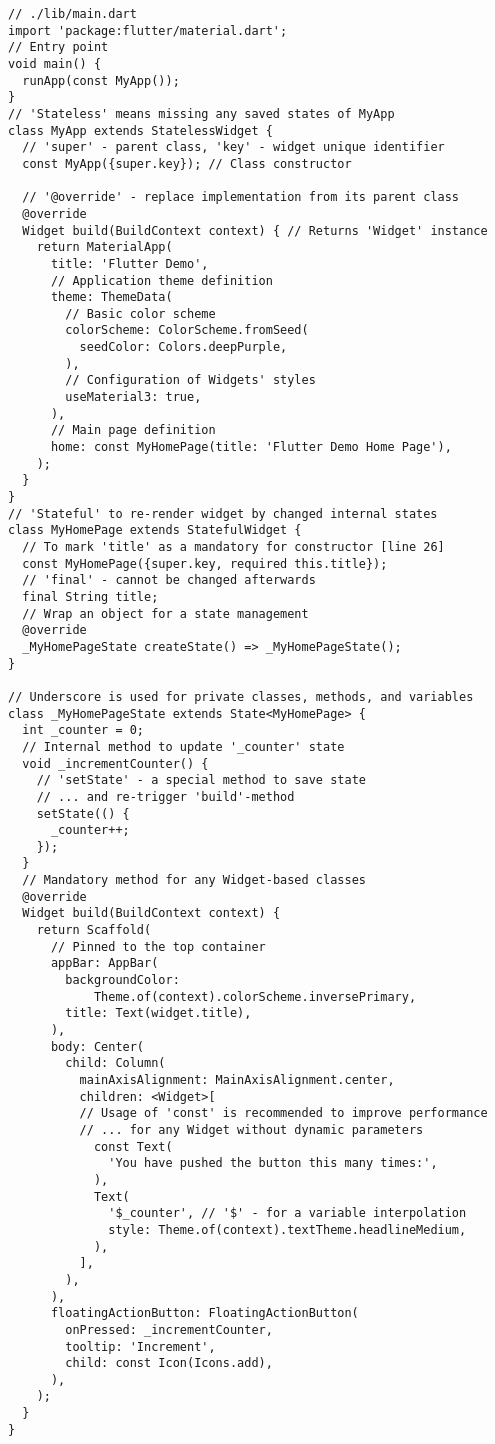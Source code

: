 \begin{lstlisting}
// ./lib/main.dart
import 'package:flutter/material.dart';
// Entry point
void main() {
  runApp(const MyApp());
}
// 'Stateless' means missing any saved states of MyApp
class MyApp extends StatelessWidget {
  // 'super' - parent class, 'key' - widget unique identifier
  const MyApp({super.key}); // Class constructor
  
  // '@override' - replace implementation from its parent class
  @override
  Widget build(BuildContext context) { // Returns 'Widget' instance
    return MaterialApp(
      title: 'Flutter Demo',
      // Application theme definition
      theme: ThemeData(
        // Basic color scheme
        colorScheme: ColorScheme.fromSeed(
          seedColor: Colors.deepPurple,
        ),
        // Configuration of Widgets' styles
        useMaterial3: true,
      ),
      // Main page definition
      home: const MyHomePage(title: 'Flutter Demo Home Page'),
    );
  }
}
// 'Stateful' to re-render widget by changed internal states
class MyHomePage extends StatefulWidget {
  // To mark 'title' as a mandatory for constructor [line 26]
  const MyHomePage({super.key, required this.title});
  // 'final' - cannot be changed afterwards
  final String title;
  // Wrap an object for a state management
  @override
  _MyHomePageState createState() => _MyHomePageState();
}

// Underscore is used for private classes, methods, and variables
class _MyHomePageState extends State<MyHomePage> {
  int _counter = 0;
  // Internal method to update '_counter' state
  void _incrementCounter() {
    // 'setState' - a special method to save state
    // ... and re-trigger 'build'-method
    setState(() {
      _counter++;
    });
  }
  // Mandatory method for any Widget-based classes
  @override
  Widget build(BuildContext context) {
    return Scaffold(
      // Pinned to the top container
      appBar: AppBar(
        backgroundColor:
            Theme.of(context).colorScheme.inversePrimary,
        title: Text(widget.title),
      ),
      body: Center(
        child: Column(
          mainAxisAlignment: MainAxisAlignment.center,
          children: <Widget>[
          // Usage of 'const' is recommended to improve performance
          // ... for any Widget without dynamic parameters
            const Text(
              'You have pushed the button this many times:',
            ),
            Text(
              '$_counter', // '$' - for a variable interpolation
              style: Theme.of(context).textTheme.headlineMedium,
            ),
          ],
        ),
      ),
      floatingActionButton: FloatingActionButton(
        onPressed: _incrementCounter,
        tooltip: 'Increment',
        child: const Icon(Icons.add),
      ),
    );
  }
}
\end{lstlisting}

